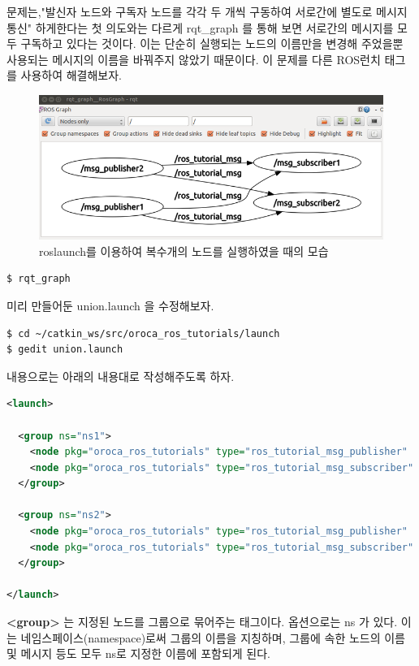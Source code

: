 문제는,"발신자 노드와 구독자 노드를 각각 두 개씩 구동하여 서로간에 별도로 메시지 통신" 하게한다는 첫 의도와는 다르게 rqt\_graph 를 통해 보면 서로간의 메시지를 모두 구독하고 있다는 것이다. 이는 단순히 실행되는 노드의 이름만을 변경해 주었을뿐 사용되는 메시지의 이름을 바꿔주지 않았기 때문이다. 이 문제를 다른 ROS런치 태그를 사용하여 해결해보자.

\begin{figure}[h]
\centering\includegraphics[width=0.9\columnwidth]{pictures/chapter7/rqt_graph_oroca_ros_tutorials_union1.png}
\caption{roslaunch를 이용하여 복수개의 노드를 실행하였을 때의 모습}
\end{figure}

\begin{lstlisting}[language=ROS]
$ rqt_graph
\end{lstlisting}

\noindent
미리 만들어둔 union.launch 을 수정해보자.

\begin{lstlisting}[language=ROS]
$ cd ~/catkin_ws/src/oroca_ros_tutorials/launch
$ gedit union.launch
\end{lstlisting}

\noindent
내용으로는 아래의 내용대로 작성해주도록 하자.

\begin{lstlisting}[language=XML]
<launch>

  <group ns="ns1">
    <node pkg="oroca_ros_tutorials" type="ros_tutorial_msg_publisher"   name="msg_publisher"/>
    <node pkg="oroca_ros_tutorials" type="ros_tutorial_msg_subscriber"  name="msg_subscriber"/>
  </group>

  <group ns="ns2">
    <node pkg="oroca_ros_tutorials" type="ros_tutorial_msg_publisher"  name="msg_publisher"/>
    <node pkg="oroca_ros_tutorials" type="ros_tutorial_msg_subscriber"  name="msg_subscriber"/>
  </group>

</launch>
\end{lstlisting}

\noindent
\textbf{\textless group\textgreater} 는 지정된 노드를 그룹으로 묶어주는 태그이다. 옵션으로는 ns 가 있다. 이는 네임스페이스(namespace)로써 그룹의 이름을 지칭하며, 그룹에 속한 노드의 이름 및 메시지 등도 모두 ns로 지정한 이름에 포함되게 된다.


